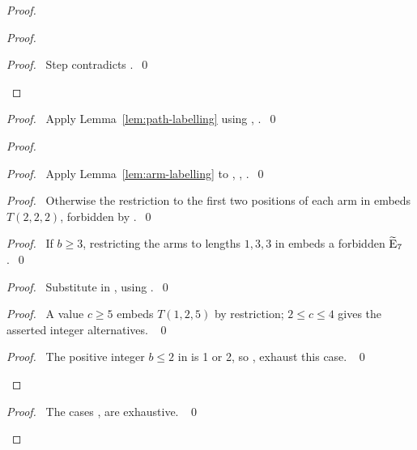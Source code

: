 \begin{proof}
\begin{proof}
\qedstep
\begin{proof}\pf\ Step  contradicts .~\qed\end{proof}
\end{proof}
\begin{proof}\pf\ Apply Lemma~\ref{lem:path-labelling} using
, .~\qed\end{proof}
\begin{proof}
\begin{proof}\pf\ Apply Lemma~\ref{lem:arm-labelling} to
, , .~\qed\end{proof}
\begin{proof}\pf\ Otherwise the restriction to the first two positions
of each arm in  embeds $T(2,2,2)$, forbidden by .~\qed\end{proof}
\begin{proof}\pf\ If $b\geq3$, restricting the arms to lengths $1,3,3$
in  embeds a forbidden $\widetilde{\mathrm{E}}_7$.~\qed\end{proof}
\begin{proof}\pf\ Substitute in , using .~\qed\end{proof}
\begin{proof}\pf\ A value $c\geq5$ embeds $T(1,2,5)$ by restriction;
$2\leq c\leq4$ gives the asserted integer alternatives. ~\qed\end{proof}
\qedstep
\begin{proof}\pf\ The positive integer $b\leq2$ in  is
1 or 2, so ,  exhaust this case. ~\qed\end{proof}
\end{proof}
\qedstep
\begin{proof}\pf\ The cases ,  are
exhaustive. ~\qed\end{proof}
\end{proof}

